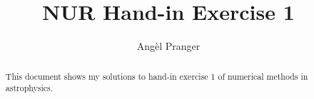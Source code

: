 \documentclass[a4paper,10pt]{article}
\title{NUR Hand-in Exercise 1}
\author{Angèl Pranger}
\begin{document}
\maketitle

\begin{abstract}
This document shows my solutions to hand-in exercise 1 of numerical methods in astrophysics.
\end{abstract}




\end{document}
